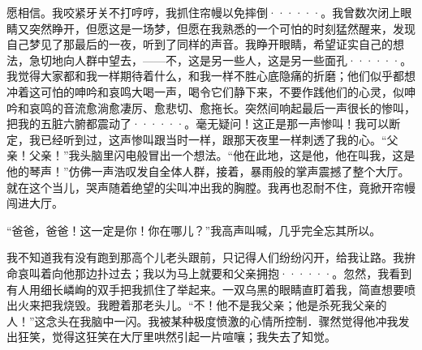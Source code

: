 \documentclass[12pt, UTF8]{ctexbook}
\begin{document}
愿相信。我咬紧牙关不打哼哼，我抓住帘幔以免摔倒······。我曾数次闭上眼睛又突然睁开，但愿这是一场梦，但愿在我熟悉的一个可怕的时刻猛然醒来，发现自己梦见了那最后的一夜，听到了同样的声音。我睁开眼睛，希望证实自己的想法，急切地向人群中望去，——不，这是另一些人，这是另一些面孔······。我觉得大家都和我一样期待着什么，和我一样不胜心底隐痛的折磨；他们似乎都想冲着这可怕的呻吟和哀鸣大喝一声，喝令它们静下来，不要作践他们的心灵，似呻吟和哀鸣的音流愈淌愈凄厉、愈悲切、愈拖长。突然间响起最后一声很长的惨叫，把我的五脏六腑都震动了······。毫无疑问！这正是那一声惨叫！我可以断定，我已经听到过，这声惨叫跟当时一样，跟那天夜里一样刺透了我的心。“父亲！父亲！”我头脑里闪电般冒出一个想法。“他在此地，这是他，他在叫我，这是他的琴声！”仿佛一声浩叹发自全体人群，接着，暴雨般的掌声震撼了整个大厅。就在这个当儿，哭声随着绝望的尖叫冲出我的胸膛。我再也忍耐不住，竟掀开帘幔闯进大厅。
\par “爸爸，爸爸！这一定是你！你在哪儿？”我高声叫喊，几乎完全忘其所以。
\par 我不知道我有没有跑到那高个儿老头跟前，只记得人们纷纷闪开，给我让路。我拚命哀叫着向他那边扑过去；我以为马上就要和父亲拥抱······。忽然，我看到有人用细长嶙峋的双手把我抓住了举起来。一双乌黑的眼睛直盯着我，简直想要喷出火来把我烧毁。我瞪着那老头儿。“不！他不是我父亲；他是杀死我父亲的人！”这念头在我脑中一闪。我被某种极度愤激的心情所控制．骤然觉得他冲我发出狂笑，觉得这狂笑在大厅里哄然引起一片喧嚷；我失去了知觉。
\newpage
\end{document}
